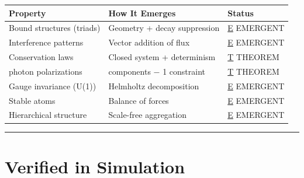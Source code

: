 \documentclass[
  11pt,
  letterpaper,
  twoside,
  openany]{book}
\makeatletter
\let\orig@section\section
\renewcommand{\section}{\needspace{8\baselineskip}\orig@section}
\makeatother
\begin{document}
\begin{longtable}[]{@{}
  >{\raggedright\arraybackslash}p{}
  >{\raggedright\arraybackslash}p{}
  >{\raggedright\arraybackslash}p{}@{}}
\toprule\noalign{}
\begin{minipage}[b]{\linewidth}\raggedright
Property
\end{minipage} & \begin{minipage}[b]{\linewidth}\raggedright
How It Emerges
\end{minipage} & \begin{minipage}[b]{\linewidth}\raggedright
Status
\end{minipage} \\
\midrule\noalign{}
\endhead
\bottomrule\noalign{}
\endlastfoot
Bound structures (triads) & Geometry + decay suppression &
\hyperref[e]{E} EMERGENT \\
Interference patterns & Vector addition of flux & \hyperref[e]{E}
EMERGENT \\
Conservation laws & Closed system + determinism & \hyperref[t]{T}
THEOREM \\
2 photon polarizations & 3 components − 1 constraint & \hyperref[t]{T}
THEOREM \\
Gauge invariance (U(1)) & Helmholtz decomposition & \hyperref[e]{E}
EMERGENT \\
Stable atoms & Balance of forces & \hyperref[e]{E} EMERGENT \\
Hierarchical structure & Scale-free aggregation & \hyperref[e]{E}
EMERGENT \\
\end{longtable}

\begin{center}\rule{0.5\linewidth}{0.5pt}\end{center}

\section{Verified in Simulation}\label{verified-in-simulation}
\end{document}
